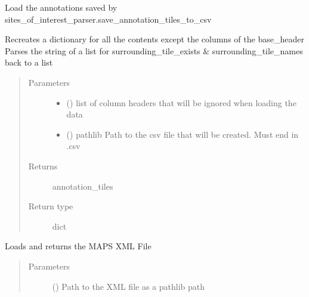 \documentclass[letterpaper,10pt,english]{sphinxmanual}
\begin{document}
\begin{fulllineitems}
\begin{fulllineitems}
\label{\detokenize{index:sites_of_interest_parser.MapsXmlParser.load_annotations_from_csv}}
Load the annotations saved by sites\_of\_interest\_parser.save\_annotation\_tiles\_to\_csv

Recreates a dictionary for all the contents except the columns of the base\_header
Parses the string of a list for surrounding\_tile\_exists \& surrounding\_tile\_names back to a list
\begin{quote}\begin{description}
\item[{Parameters}] \leavevmode\begin{itemize}
\item {} 
 () \textendash{} list of column headers that will be ignored when loading the data

\item {} 
 () \textendash{} pathlib Path to the csv file that will be created. Must end in .csv

\end{itemize}

\item[{Returns}] \leavevmode
annotation\_tiles

\item[{Return type}] \leavevmode
dict

\end{description}\end{quote}

\end{fulllineitems}


\begin{fulllineitems}
\label{\detokenize{index:sites_of_interest_parser.MapsXmlParser.load_xml}}
Loads and returns the MAPS XML File
\begin{quote}\begin{description}
\item[{Parameters}] \leavevmode
{} () \textendash{} Path to the XML file as a pathlib path


\end{description}
\end{quote}
\end{fulllineitems}
\end{fulllineitems}
\end{document}
